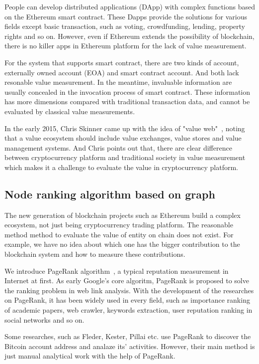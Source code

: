 People can develop distributed applications (DApp) with complex functions based on the Ethereum smart contract. These Dapps provide the solutions for various fields except basic transaction, such as voting, crowdfunding, lending, property rights and so on.
However, even if Ethereum extends the possibility of blockchain, there is no killer apps in Ethereum platform for the lack of value measurement.

For the system that supports smart contract, there are two kinds of account, externally owned account (EOA) and smart contract account. And both lack resonable value measurement. In the meantime, invaluable information are usually concealed in the invocation process of smart contract. These information has more dimensions compared with traditional transaction data, and cannot be evaluated by classical value measurements.

In the early 2015, Chris Skinner came up with the idea of "value web"~\cite{ChrisSkinner}, noting that a value ecosystem should include value exchanges, value stores and value management systems. And Chris points out that, there are clear difference between cryptocurrency platform and traditional society in value measurement which makes it a challenge to evaluate the value in cryptocurrency platform.

\subsection{Node ranking algorithm based on graph}
The new generation of blockchain projects such as Ethereum build a complex ecosystem, not just being cryptocurrency trading platform. The reasonable method method to evaluate the value of entity on chain does not exist. For example, we have no idea about which one has the bigger contribution to the blockchain system and how to measure these contributions.

We introduce PageRank algorithm~\cite{page1999pagerank}, a typical reputation measurement in Internet at first. As early Google's core algoritm, PageRank is proposed to solve the ranking problem in web link analysis. With the development of the researches on PageRank, it has been widely used in every field, such as importance ranking of academic papers, web crawler, keywords extraction, user reputation ranking in social networks and so on.

Some researches, such as Fleder, Kester, Pillai etc. use PageRank to discover the Bitcoin account address and analaze its' activities. However, their main method is just manual analytical work with the help of PageRank.


